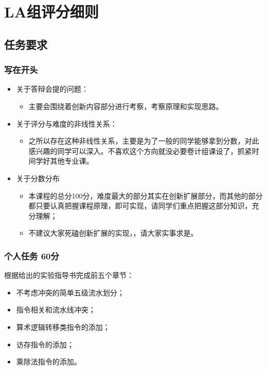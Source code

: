 \section{LA组评分细则}

\subsection{任务要求}

\subsubsection{写在开头}


\begin{itemize}
    \item 关于答辩会提的问题：
    \begin{itemize}
        \item 主要会围绕着创新内容部分进行考察，考察原理和实现思路。
    \end{itemize}
    \item 关于评分与难度的非线性关系：
    \begin{itemize}
        \item 之所以存在这种非线性关系，主要是为了一般的同学能够拿到分数，对此感兴趣的同学可以深入。不喜欢这个方向就没必要卷计组课设了，抓紧时间学好其他专业课。
    \end{itemize}
    \item 关于分数分布
    \begin{itemize}
        \item 本课程的总分100分，难度最大的部分其实在创新扩展部分，而其他的部分都只要认真把握课程原理，即可实现，请同学们重点把握这部分知识，充分理解；
        \item 不建议大家死磕创新扩展的实现，，请大家实事求是。
    \end{itemize}
\end{itemize}

\subsubsection{个人任务 60分}

根据给出的实验指导书完成前五个章节：

\begin{itemize}
    \item 不考虑冲突的简单五级流水划分；
    \item 指令相关和流水线冲突；
    \item 算术逻辑转移类指令的添加；
    \item 访存指令的添加；
    \item 乘除法指令的添加。
\end{itemize}

